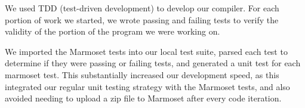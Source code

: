 \documentclass[letterpaper]{article}
\begin{document}
  We used TDD (test-driven development) to develop our compiler. For each
  portion of work we started, we wrote passing and failing tests to verify the
  validity of the portion of the program we were working on.

  We imported the Marmoset tests into our local test suite, parsed each test to
  determine if they were passing or failing tests, and generated a unit test for
  each marmoset test. This substantially increased our development speed, as
  this integrated our regular unit testing strategy with the Marmoset tests, and
  also avoided needing to upload a zip file to Marmoset after every code
  iteration.
\end{document}
